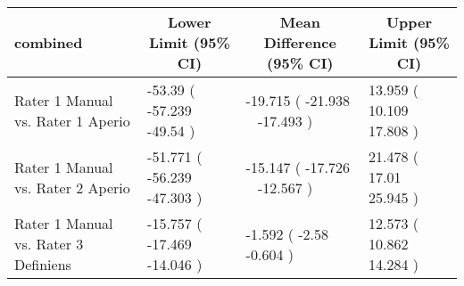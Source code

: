 \begin{table}[!tbp]
\begin{center}
\begin{tabular}{llll}
\hline\hline
\multicolumn{1}{l}{combined}&\multicolumn{1}{c}{Lower Limit (95\% CI)}&\multicolumn{1}{c}{Mean Difference (95\% CI)}&\multicolumn{1}{c}{Upper Limit (95\% CI)}\tabularnewline
\hline
Rater 1 Manual vs. Rater 1 Aperio&-53.39 ( -57.239 ~ -49.54 )&-19.715 ( -21.938 ~ -17.493 )&13.959 ( 10.109 ~ 17.808 )\tabularnewline
Rater 1 Manual vs. Rater 2 Aperio&-51.771 ( -56.239 ~ -47.303 )&-15.147 ( -17.726 ~ -12.567 )&21.478 ( 17.01 ~ 25.945 )\tabularnewline
Rater 1 Manual vs. Rater 3 Definiens&-15.757 ( -17.469 ~ -14.046 )&-1.592 ( -2.58 ~ -0.604 )&12.573 ( 10.862 ~ 14.284 )\tabularnewline
\hline
\end{tabular}\end{center}

\end{table}
